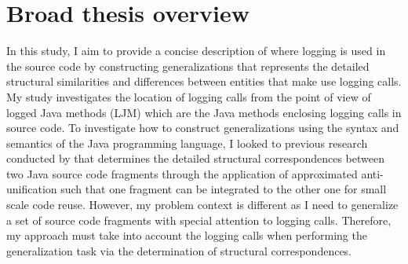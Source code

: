 %
%
%



\section{Broad thesis overview} \label{intro-overview}

In this study, I aim to provide a concise description of where logging is used in the source code by constructing generalizations that represents the detailed structural similarities and differences between entities that make use logging calls. My study investigates the location of logging calls from the point of view of logged Java methods (LJM) which are the Java methods enclosing logging calls in source code. To investigate how to construct generalizations using the syntax and semantics of the Java programming language, I looked to previous research conducted by \citet{cottrell2008semi} that determines the detailed structural correspondences between two Java source code fragments through the application of approximated anti-unification such that one fragment can be integrated to the other one for small scale code reuse. However, my problem context is different as I need to generalize a set of source code fragments with special attention to logging calls. Therefore, my approach must take into account the logging calls when performing the generalization task via the determination of structural correspondences.

